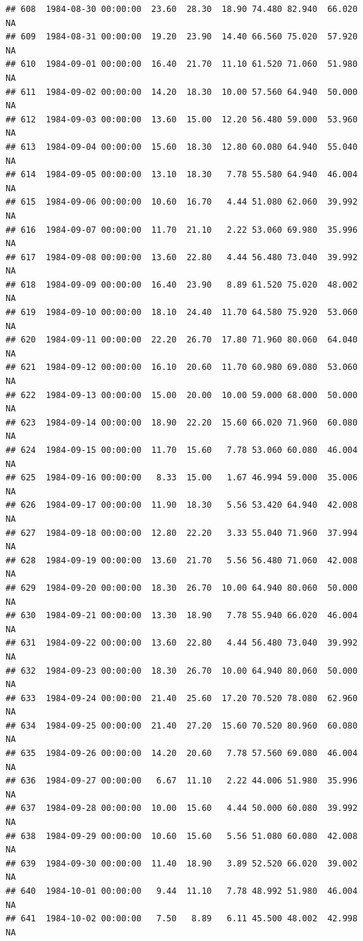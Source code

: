 \documentclass{article}\usepackage{graphicx, color}
\makeatletter
\newenvironment{kframe}{%
 \def\at@end@of@kframe{}%
 \ifinner\ifhmode%
  \def\at@end@of@kframe{\end{minipage}}%
  \begin{minipage}{\columnwidth}%
 \fi\fi%
 \def\FrameCommand##1{\hskip\@totalleftmargin \hskip-\fboxsep
 \colorbox{shadecolor}{##1}\hskip-\fboxsep
     \hskip-\linewidth \hskip-\@totalleftmargin \hskip\columnwidth}%
 \MakeFramed {\advance\hsize-\width
   \@totalleftmargin\z@ \linewidth\hsize
   \@setminipage}}%
 {\par\unskip\endMakeFramed%
 \at@end@of@kframe}
\newenvironment{knitrout}{}{} %
\makeatother
\begin{document}
\begin{knitrout}
\begin{kframe}
\begin{verbatim}
## 608  1984-08-30 00:00:00  23.60  28.30  18.90 74.480 82.940  66.020     NA
## 609  1984-08-31 00:00:00  19.20  23.90  14.40 66.560 75.020  57.920     NA
## 610  1984-09-01 00:00:00  16.40  21.70  11.10 61.520 71.060  51.980     NA
## 611  1984-09-02 00:00:00  14.20  18.30  10.00 57.560 64.940  50.000     NA
## 612  1984-09-03 00:00:00  13.60  15.00  12.20 56.480 59.000  53.960     NA
## 613  1984-09-04 00:00:00  15.60  18.30  12.80 60.080 64.940  55.040     NA
## 614  1984-09-05 00:00:00  13.10  18.30   7.78 55.580 64.940  46.004     NA
## 615  1984-09-06 00:00:00  10.60  16.70   4.44 51.080 62.060  39.992     NA
## 616  1984-09-07 00:00:00  11.70  21.10   2.22 53.060 69.980  35.996     NA
## 617  1984-09-08 00:00:00  13.60  22.80   4.44 56.480 73.040  39.992     NA
## 618  1984-09-09 00:00:00  16.40  23.90   8.89 61.520 75.020  48.002     NA
## 619  1984-09-10 00:00:00  18.10  24.40  11.70 64.580 75.920  53.060     NA
## 620  1984-09-11 00:00:00  22.20  26.70  17.80 71.960 80.060  64.040     NA
## 621  1984-09-12 00:00:00  16.10  20.60  11.70 60.980 69.080  53.060     NA
## 622  1984-09-13 00:00:00  15.00  20.00  10.00 59.000 68.000  50.000     NA
## 623  1984-09-14 00:00:00  18.90  22.20  15.60 66.020 71.960  60.080     NA
## 624  1984-09-15 00:00:00  11.70  15.60   7.78 53.060 60.080  46.004     NA
## 625  1984-09-16 00:00:00   8.33  15.00   1.67 46.994 59.000  35.006     NA
## 626  1984-09-17 00:00:00  11.90  18.30   5.56 53.420 64.940  42.008     NA
## 627  1984-09-18 00:00:00  12.80  22.20   3.33 55.040 71.960  37.994     NA
## 628  1984-09-19 00:00:00  13.60  21.70   5.56 56.480 71.060  42.008     NA
## 629  1984-09-20 00:00:00  18.30  26.70  10.00 64.940 80.060  50.000     NA
## 630  1984-09-21 00:00:00  13.30  18.90   7.78 55.940 66.020  46.004     NA
## 631  1984-09-22 00:00:00  13.60  22.80   4.44 56.480 73.040  39.992     NA
## 632  1984-09-23 00:00:00  18.30  26.70  10.00 64.940 80.060  50.000     NA
## 633  1984-09-24 00:00:00  21.40  25.60  17.20 70.520 78.080  62.960     NA
## 634  1984-09-25 00:00:00  21.40  27.20  15.60 70.520 80.960  60.080     NA
## 635  1984-09-26 00:00:00  14.20  20.60   7.78 57.560 69.080  46.004     NA
## 636  1984-09-27 00:00:00   6.67  11.10   2.22 44.006 51.980  35.996     NA
## 637  1984-09-28 00:00:00  10.00  15.60   4.44 50.000 60.080  39.992     NA
## 638  1984-09-29 00:00:00  10.60  15.60   5.56 51.080 60.080  42.008     NA
## 639  1984-09-30 00:00:00  11.40  18.90   3.89 52.520 66.020  39.002     NA
## 640  1984-10-01 00:00:00   9.44  11.10   7.78 48.992 51.980  46.004     NA
## 641  1984-10-02 00:00:00   7.50   8.89   6.11 45.500 48.002  42.998     NA

\end{verbatim}
\end{kframe}
\end{knitrout}
\end{document}
